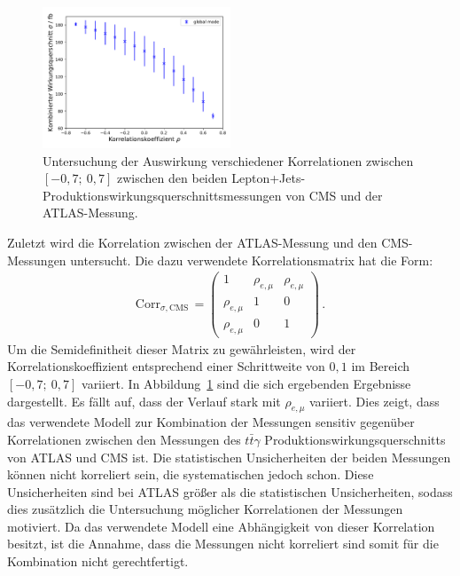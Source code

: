 \begin{figure}
  \centering
  \includegraphics[width=0.5\textwidth]{Plots/corr_CA.pdf}
  \caption{Untersuchung der Auswirkung verschiedener Korrelationen zwischen $[-0,7;~0,7]$ zwischen den beiden Lepton+Jets-Produktionswirkungsquerschnittsmessungen von CMS und der ATLAS-Messung.}
  \label{fig:corrCA}
\end{figure}
Zuletzt wird die Korrelation zwischen der ATLAS-Messung und den CMS-Messungen untersucht. Die dazu verwendete Korrelationsmatrix hat die Form:
\begin{align}
  \text{Corr}_{\sigma,\text{CMS}}\,=\begin{pmatrix}
  1 & \rho_{e, \mu} & \rho_{e, \mu}\\
  \rho_{e, \mu} & 1 &0\\
  \rho_{e, \mu} & 0 & 1
  \end{pmatrix} \, .
  \label{eqn:matrix2}
\end{align}
Um die Semidefinitheit dieser Matrix zu gewährleisten, wird der Korrelationskoeffizient entsprechend einer Schrittweite von $0,1$ im Bereich $[-0,7;~0,7]$ variiert. In Abbildung~\ref{fig:corrCA} sind die sich ergebenden Ergebnisse dargestellt. Es fällt auf, dass der Verlauf stark mit $\rho_{e, \mu}$ variiert.
Dies zeigt, dass das verwendete Modell zur Kombination der Messungen sensitiv gegenüber Korrelationen zwischen den Messungen des $t\bar{t}\gamma$ Produktionswirkungsquerschnitts von ATLAS und CMS ist.
Die statistischen Unsicherheiten der beiden Messungen können nicht korreliert sein, die systematischen jedoch schon. Diese Unsicherheiten sind bei ATLAS größer als die statistischen Unsicherheiten, sodass dies zusätzlich die Untersuchung möglicher Korrelationen der Messungen motiviert. Da das verwendete Modell eine Abhängigkeit von dieser Korrelation besitzt, ist die Annahme, dass die Messungen nicht korreliert sind somit für die Kombination nicht gerechtfertigt.

